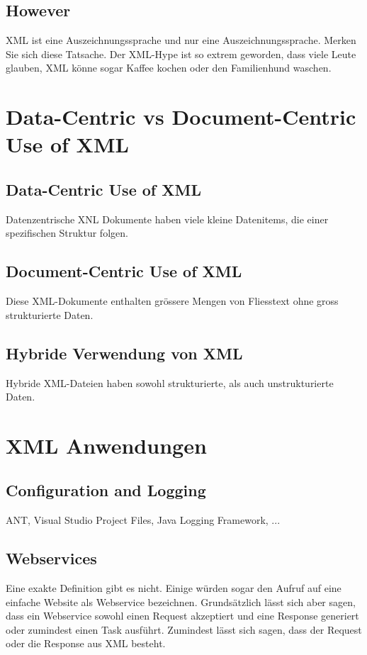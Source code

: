\subsection{However}
XML ist eine Auszeichnungssprache und nur eine Auszeichnungssprache. Merken Sie sich diese Tatsache.
Der XML-Hype ist so extrem geworden, dass viele Leute glauben, XML könne sogar Kaffee kochen oder den Familienhund waschen.
\section{Data-Centric vs Document-Centric Use of XML}
\subsection{Data-Centric Use of XML}
Datenzentrische XNL Dokumente haben viele kleine Datenitems, die einer spezifischen Struktur folgen.

\subsection{Document-Centric Use of XML}
Diese XML-Dokumente enthalten grössere Mengen von Fliesstext ohne gross strukturierte Daten.

\subsection{Hybride Verwendung von XML}
Hybride XML-Dateien haben sowohl strukturierte, als auch unstrukturierte Daten.

\section{XML Anwendungen}
\subsection{Configuration and Logging}
ANT, Visual Studio Project Files, Java Logging Framework, ...
\subsection{Webservices}
Eine exakte Definition gibt es nicht. Einige würden sogar den Aufruf auf eine einfache Website als Webservice bezeichnen. Grundsätzlich lässt sich aber sagen, dass ein Webservice sowohl einen Request akzeptiert und eine Response generiert oder zumindest einen Task ausführt. Zumindest lässt sich sagen, dass der Request oder die Response aus XML besteht.

